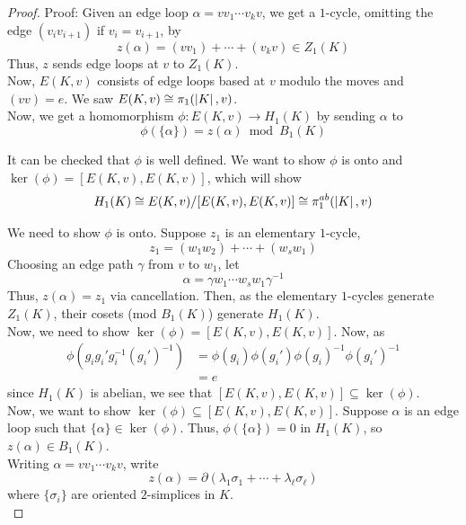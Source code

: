 \begin{proof}{Proof:}
    Given an edge loop $\alpha = vv_1 \cdots v_kv$, we get a $1$-cycle, omitting the edge $(v_iv_{i + 1})$ if $v_i = v_{i + 1}$, by
    \[ z(\alpha) = (vv_1) + \cdots + (v_kv) \in Z_1(K) \]
    Thus, $z$ sends edge loops at $v$ to $Z_1(K)$.\\

    Now, $E(K, v)$ consists of edge loops based at $v$ modulo the moves
    and $(vv) = e$. We saw $E(K, v) \cong \pi_1(\left\lvert {K} \right\rvert, v)$.\\

   
    Now, we get a homomorphism $\phi : E(K, v) \to H_1(K)$ by sending $\alpha$ to
    \[ \phi(\{\alpha\}) = z(\alpha) \bmod B_1(K) \]

    It can be checked that $\phi$ is well defined. We want to show $\phi$ is onto and $\ker(\phi) = [E(K, v), E(K, v)]$, which will show
    \[ H_1(K) \cong E(K, v)/[E(K, v), E(K, v)] \cong \pi_1^{ab}(\left\lvert {K} \right\rvert, v) \]


    We need to show $\phi$ is onto. Suppose $z_1$ is an elementary $1$-cycle,
    \[ z_1 = (w_1w_2) + \cdots + (w_sw_1) \]
    Choosing an edge path $\gamma$ from $v$ to $w_1$, let
    \[ \alpha = \gamma w_1 \cdots w_sw_1\gamma^{-1} \]
    Thus, $z(\alpha) = z_1$ via cancellation. Then, as the elementary $1$-cycles generate $Z_1(K)$, their cosets (mod $B_1(K)$) generate $H_1(K)$.\\

    Now, we need to show $\ker(\phi) = [E(K, v), E(K, v)]$. Now, as
    \begin{align*}
        \phi(g_ig_i'g_i^{-1}(g_i')^{-1}) &= \phi(g_i)\phi(g_i')\phi(g_i)^{-1}\phi(g_i')^{-1}\\
        &= e
    \end{align*}
    since $H_1(K)$ is abelian, we see that $[E(K, v), E(K, v)] \subseteq \ker(\phi)$.\\
    
    Now, we want to show $\ker(\phi) \subseteq [E(K, v), E(K, v)]$. Suppose $\alpha$ is an edge loop such that $\{\alpha\} \in \ker(\phi)$. Thus, $\phi(\{\alpha\}) = 0$ in $H_1(K)$, so $z(\alpha) \in B_1(K)$.\\

    Writing $\alpha = vv_1 \cdots v_kv$, write
    \[ z(\alpha) = \partial(\lambda_1\sigma_1 + \cdots + \lambda_{\ell}\sigma_{\ell}) \]
    where $\{\sigma_i\}$ are oriented $2$-simplices in $K$.\\


\end{proof}
